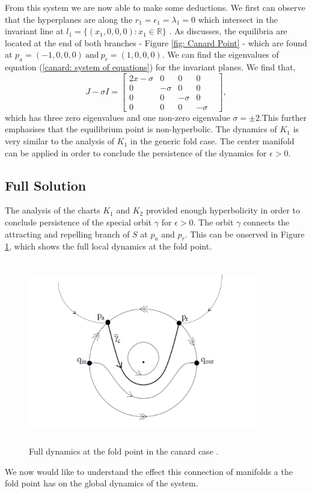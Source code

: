 From this system we are now able to make some deductions. We first can observe that the hyperplanes are along the $r_1=\epsilon_1=\lambda_1=0$ which intersect in the invariant line at $l_1=\{(x_1,0,0,0): x_1\in\mathbb{R}\}$ \citep{krupa2001}. As \citet{krupa2001} discusses, the equilibria are located at the end of both branches - Figure \ref{fig: Canard Point} - which are found at $p_a=(-1,0,0,0) \ \text{and} \ p_r=(1,0,0,0)$. We can find the eigenvalues of equation (\ref{canard: system of equations}) for the invariant planes. We find that, 
\begin{equation}
J-\sigma I= \begin{bmatrix}
2x-\sigma & 0 & 0 & 0  \\
0 & -\sigma & 0 & 0&\\
0 & 0 & -\sigma & 0 \\
0 & 0 & 0 & -\sigma
\end{bmatrix},
\end{equation}
which has three zero eigenvalues and one non-zero eigenvalue $\sigma=\pm 2$.This further emphasises that the equilibrium point is non-hyperbolic. 
The dynamics of $K_1$ is very similar to the analysis of $K_1$ in the generic fold case. The center manifold can be applied in order to conclude the persistence of the dynamics for $\epsilon >0$.

\subsection{Full Solution}
The analysis of the charts $K_1$ and $K_2$ provided enough hyperbolicity in order to conclude persistence of the special orbit $\gamma$ for $\epsilon >0$. The orbit $\gamma$ connects the attracting and repelling branch of $S$ at $p_a$ and $p_r$. This can be onserved in Figure \ref{canardsolloc}, which shows the full local dynamics at the fold point.
\begin{figure}[h!]\centering
	\includegraphics[height=8cm,width=10cm]{Images/pres-cancard}
	\caption{Full dynamics at the fold point in the canard case \citep{krupa}.}
	\label{canardsolloc}
\end{figure}
We now would like to understand the effect this connection of manifolds a the fold point has on the global dynamics of the system.

